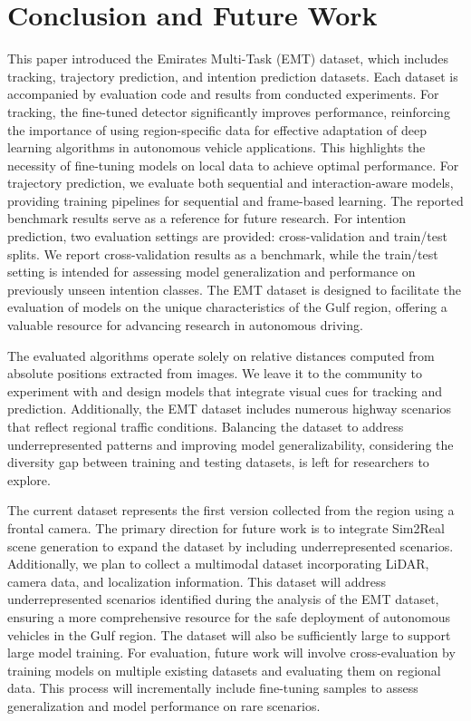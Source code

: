 \section{Conclusion and Future Work}
\label{sec:conclusion}

This paper introduced the Emirates Multi-Task (EMT) dataset, which includes tracking, trajectory prediction, and intention prediction datasets. Each dataset is accompanied by evaluation code and results from conducted experiments. For tracking, the fine-tuned detector significantly improves performance, reinforcing the importance of using region-specific data for effective adaptation of deep learning algorithms in autonomous vehicle applications. This highlights the necessity of fine-tuning models on local data to achieve optimal performance. For trajectory prediction, we evaluate both sequential and interaction-aware models, providing training pipelines for sequential and frame-based learning. The reported benchmark results serve as a reference for future research. For intention prediction, two evaluation settings are provided: cross-validation and train/test splits. We report cross-validation results as a benchmark, while the train/test setting is intended for assessing model generalization and performance on previously unseen intention classes. The EMT dataset is designed to facilitate the evaluation of models on the unique characteristics of the Gulf region, offering a valuable resource for advancing research in autonomous driving.


The evaluated algorithms operate solely on relative distances computed from absolute positions extracted from images. We leave it to the community to experiment with and design models that integrate visual cues for tracking and prediction. Additionally, the EMT dataset includes numerous highway scenarios that reflect regional traffic conditions. Balancing the dataset to address underrepresented patterns and improving model generalizability, considering the diversity gap between training and testing datasets, is left for researchers to explore.

The current dataset represents the first version collected from the region using a frontal camera. The primary direction for future work is to integrate Sim2Real scene generation to expand the dataset by including underrepresented scenarios. Additionally, we plan to collect a multimodal dataset incorporating LiDAR, camera data, and localization information. This dataset will address underrepresented scenarios identified during the analysis of the EMT dataset, ensuring a more comprehensive resource for the safe deployment of autonomous vehicles in the Gulf region. The dataset will also be sufficiently large to support large model training. For evaluation, future work will involve cross-evaluation by training models on multiple existing datasets and evaluating them on regional data. This process will incrementally include fine-tuning samples to assess generalization and model performance on rare scenarios.